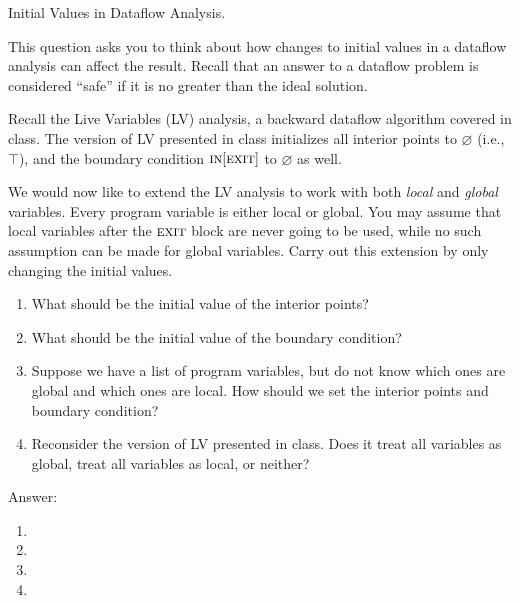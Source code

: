 \begin{problem}
Initial Values in Dataflow Analysis.

\item This question asks you to think about how changes to initial values in a dataflow analysis can affect the result. Recall that an answer to a dataflow problem is considered ``safe'' if it is no greater than the ideal solution.

\smallskip

\begin{problempart}
	Recall the Live Variables (LV) analysis, a backward dataflow algorithm covered in class. The version of LV presented in class initializes all interior points to $\varnothing$ (i.e., $\top$), and the boundary condition $\textsc{in}[\textsc{exit}]$ to $\varnothing$ as well.

	We would now like to extend the LV analysis to work with both \emph{local} and \emph{global} variables. Every program variable is either local or global.
	You may assume that local variables after the $\textsc{exit}$ block are never going to be used, while no such assumption can be made for global variables. Carry out this extension by only changing the initial values.
	\begin{enumerate}
		\item What should be the initial value of the interior points?
		\item What should be the initial value of the boundary condition?
		\item Suppose we have a list of program variables, but do not know which ones are global and which ones are local. How should we set the interior points and boundary condition?
		\item Reconsider the version of LV presented in class. Does it treat all variables as global, treat all variables as local, or neither?
	\end{enumerate}

	\item Answer:
	\begin{enumerate}
		\item {\color{red}{Set all interior points to $\Phi = \top$}}
		\item {\color{red}{Initialize the boundary condition to the set of global variables.}}
		\item {\color{red}{For safety, assume all program variables are global. Initialize the boundary condition
		to the universal set (i.e., $\bot$). This is safe since $\bot$ is no greater than any other set,
		including the actual set of global variables.}}
		\item {\color{red}{The version of LV presented in class initializes the boundary condition to $\Phi$, and so
		assumes the set of global variables is $\Phi$. In other words, it treats all variables as local.}}
	\end{enumerate}



\end{problempart}
\end{problem}
